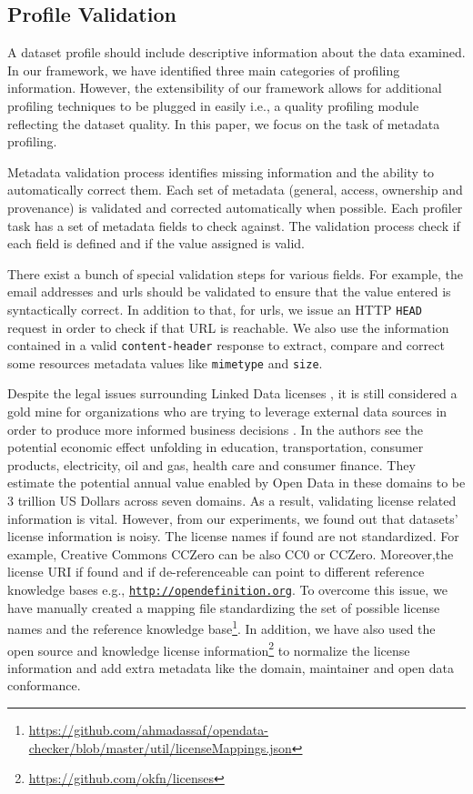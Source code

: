 \documentclass[runningheads,a4paper]{llncs}
\begin{document}
\subsection{Profile Validation}

A dataset profile should include descriptive information about the data examined. In our framework, we have identified three main categories of profiling information. However, the extensibility of our framework allows for additional profiling techniques to be plugged in easily i.e., a quality profiling module reflecting the dataset quality. In this paper, we focus on the task of metadata profiling.

Metadata validation process identifies missing information and the ability to automatically correct them. Each set of metadata (general, access, ownership and provenance) is validated and corrected automatically when possible. Each profiler task has a set of metadata fields to check against. The validation process check if each field is defined and if the value assigned is valid.

There exist a bunch of special validation steps for various fields. For example, the email addresses and urls should be validated to ensure that the value entered is syntactically correct. In addition to that, for urls, we issue an HTTP \texttt{HEAD} request in order to check if that URL is reachable. We also use the information contained in a valid \texttt{content-header} response to extract, compare and correct some resources metadata values like \texttt{mimetype} and \texttt{size}.

Despite the legal issues surrounding Linked Data licenses \cite{nomoneyLOD}, it is still considered a gold mine for organizations who are trying to leverage external data sources in order to produce more informed business decisions \cite{Boyd2011}. In \cite{mckinseyreport} the authors see the potential economic effect unfolding in education, transportation, consumer products, electricity, oil and gas, health care and consumer finance. They estimate the potential annual value enabled by Open Data in these domains to be 3 trillion US Dollars across seven domains. As a result, validating license related information is vital. However, from our experiments, we found out that datasets' license information is noisy. The license names if found are not standardized. For example, Creative Commons CCZero can be also CC0 or CCZero. Moreover,the license URI if found and if de-referenceable can point to different reference knowledge bases e.g., \texttt{\url{http://opendefinition.org}}. To overcome this issue, we have manually created a mapping file standardizing the set of possible license names and the reference knowledge base\footnote{\url{https://github.com/ahmadassaf/opendata-checker/blob/master/util/licenseMappings.json}}. In addition, we have also used the open source and knowledge license information\footnote{\url{https://github.com/okfn/licenses}} to normalize the license information and add extra metadata like the domain, maintainer and open data conformance.
\end{document}
